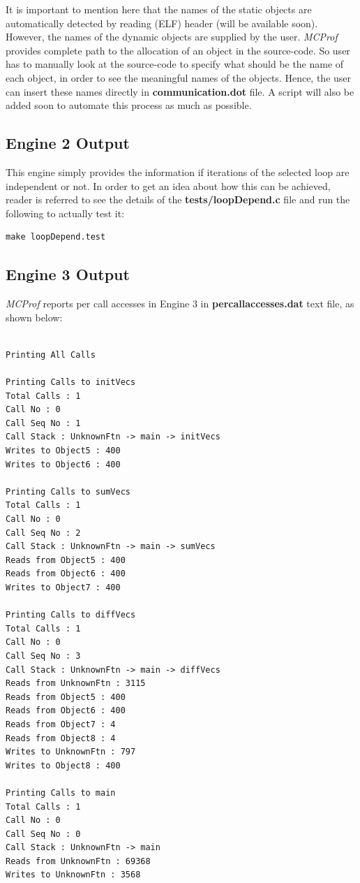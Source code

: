 \documentclass[10pt]{article}
\newcommand{\MCPROF}{\emph{MCProf}}
\begin{document}
It is important to mention here that the names of the static objects are 
automatically detected by reading (ELF) header (will be available soon). 
However, the names of the dynamic objects are supplied by the user. \MCPROF{} 
provides complete path to the allocation of an object in the source-code. So 
user has to manually look at the source-code to specify what should be the name 
of each object, in order to see the meaningful names of the objects. Hence, the 
user can insert these names directly in \textbf{communication.dot} file. A 
script will also be added soon to automate this process as much as possible.

\subsection{Engine 2 Output}
This engine simply provides the information if iterations of the selected loop
are independent or not. In order to get an idea about how this can be achieved,
reader is referred to see the details of the \textbf{tests/loopDepend.c} file
and run the following to actually test it:

{
\small
\begin{Verbatim}[frame=single]
make loopDepend.test
\end{Verbatim}
}

\subsection{Engine 3 Output}

\MCPROF{} reports per call accesses in Engine 3 in \textbf{percallaccesses.dat}
text file, as shown below:

{
\scriptsize
\begin{Verbatim}[frame=single]

Printing All Calls

Printing Calls to initVecs
Total Calls : 1
Call No : 0
Call Seq No : 1
Call Stack : UnknownFtn -> main -> initVecs
Writes to Object5 : 400
Writes to Object6 : 400

Printing Calls to sumVecs
Total Calls : 1
Call No : 0
Call Seq No : 2
Call Stack : UnknownFtn -> main -> sumVecs
Reads from Object5 : 400
Reads from Object6 : 400
Writes to Object7 : 400

Printing Calls to diffVecs
Total Calls : 1
Call No : 0
Call Seq No : 3
Call Stack : UnknownFtn -> main -> diffVecs
Reads from UnknownFtn : 3115
Reads from Object5 : 400
Reads from Object6 : 400
Reads from Object7 : 4
Reads from Object8 : 4
Writes to UnknownFtn : 797
Writes to Object8 : 400

Printing Calls to main
Total Calls : 1
Call No : 0
Call Seq No : 0
Call Stack : UnknownFtn -> main
Reads from UnknownFtn : 69368
Writes to UnknownFtn : 3568
\end{Verbatim}
}
\end{document}
